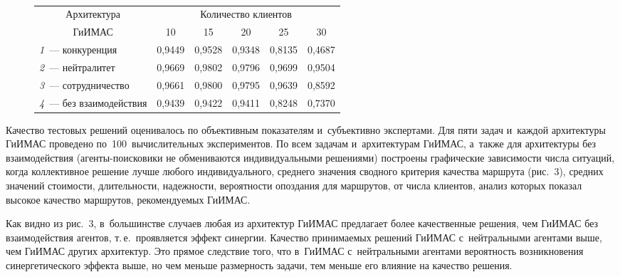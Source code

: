 \begin{multicols}{2}
\begin{figure*} %
\vspace*{1pt}
\begin{center}
\mbox{%
\epsfxsize=76.365mm
}
\end{center}
\vspace*{2pt}
\begin{center}
{\small \begin{tabular}{|l|c|c|c|c|c|}
\hline
\multicolumn{1}{|c|}{Архитектура} &\multicolumn{5}{c|}{Количество клиентов}\\
\cline{2-6}
\multicolumn{1}{|c|}{ГиИМАС} & 10&15&20&25&30\\
\hline
\textit{1}~--- конкуренция& 0,9449& 0,9528& 0,9348& 0,8135& 0,4687\\
\textit{2}~--- нейтралитет& 0,9669& 0,9802 & 0,9796& 0,9699& 0,9504\\
\textit{3}~--- сотрудничество& 0,9661& 0,9800& 0,9795& 0,9639& 0,8592\\
\textit{4}~--- без взаимодействия& 0,9439& 0,9422& 0,9411& 0,8248& 0,7370\\
\hline
\end{tabular}}
\end{center}
\vspace*{-3pt}
\end{figure*}


  Качество тестовых решений оценивалось по объективным показателям 
и~субъективно экспертами. Для пяти задач и~каждой архитектуры \mbox{ГиИМАС} 
проведено по~100~вычислительных экспериментов. По всем задачам 
и~архитектурам \mbox{ГиИМАС}, а~также для архитектуры без взаимодействия  
(аген\-ты-по\-иско\-ви\-ки не обмениваются индивидуальными решениями) 
построены графические зависимости чис\-ла ситуаций, когда коллективное 
решение лучше любого индивидуального, среднего значения сводного 
критерия качества маршрута (рис.~3), средних значений сто\-имости, 
длительности, на\-деж\-ности, ве\-ро\-ят\-ности опоздания для маршрутов, от чис\-ла 
клиентов, анализ которых показал высокое качество марш\-ру\-тов, 
рекомендуемых ГиИМАС. 



  Как видно из рис.~3, в~большинстве случаев любая из архитектур \mbox{ГиИМАС}
предлагает более качественные решения, чем \mbox{ГиИМАС} без взаимодействия 
агентов, т.\,е.\ проявляется эффект синергии. Качество принимаемых решений 
\mbox{ГиИМАС} с~нейтральными агентами выше, чем \mbox{ГиИМАС} других архитектур. 
Это прямое следствие того, что в~\mbox{ГиИМАС} с~нейтральными агентами 
вероятность возникновения синергетического эффекта выше, но чем меньше 
размерность задачи, тем меньше его влияние на качество решения.
  

\end{multicols}
